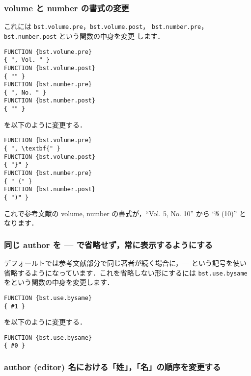 \documentclass[a4j,10pt]{jarticle}
\begin{document}
\subsubsection{volume と number の書式の変更}

これには \texttt{bst.volume.pre}，\texttt{bst.volume.post}，
\texttt{bst.number.pre}，\texttt{bst.number.post} という関数の中身を変更
します．

\begin{screen}
\begin{verbatim}
FUNCTION {bst.volume.pre}
{ ", Vol. " }
FUNCTION {bst.volume.post}
{ "" }
FUNCTION {bst.number.pre}
{ ", No. " }
FUNCTION {bst.number.post}
{ "" }
\end{verbatim}
\end{screen}
を以下のように変更する．
\begin{screen}
\begin{verbatim}
FUNCTION {bst.volume.pre}
{ ", \textbf{" }
FUNCTION {bst.volume.post}
{ "}" }
FUNCTION {bst.number.pre}
{ " (" }
FUNCTION {bst.number.post}
{ ")" }
\end{verbatim}
\end{screen}

これで参考文献の volume, number の書式が，``Vol. 5, No. 10'' から 
``\textbf{5} (10)'' となります．

\subsubsection{同じ author を --- で省略せず，常に表示するようにする}

デフォールトでは参考文献部分で同じ著者が続く場合に，--- という記号を使い
省略するようになっています．これを省略しない形にするには 
\texttt{bst.use.bysame} をという関数の中身を変更します．
\begin{screen}
\begin{verbatim}
FUNCTION {bst.use.bysame}
{ #1 }  
\end{verbatim}
\end{screen}
を以下のように変更する．
\begin{screen}
\begin{verbatim}
FUNCTION {bst.use.bysame}
{ #0 }  
\end{verbatim}
\end{screen}

\subsubsection{author (editor) 名における「姓」，「名」の順序を変更する}
\end{document}
